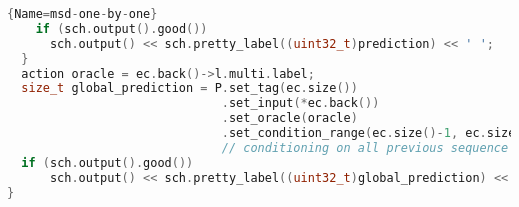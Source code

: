 \begin{appendix}
\begin{lstlisting}[language=C++,
                   basicstyle=\scriptsize\ttfamily]{Name=msd-one-by-one}
    if (sch.output().good())
      sch.output() << sch.pretty_label((uint32_t)prediction) << ' ';
  }
  action oracle = ec.back()->l.multi.label;
  size_t global_prediction = P.set_tag(ec.size())
                              .set_input(*ec.back())
                              .set_oracle(oracle)
                              .set_condition_range(ec.size()-1, ec.size()-1, 'a').predict();
                              // conditioning on all previous sequence decisions
  if (sch.output().good())
      sch.output() << sch.pretty_label((uint32_t)global_prediction) << ' ';
}
\end{lstlisting}
\end{appendix}
